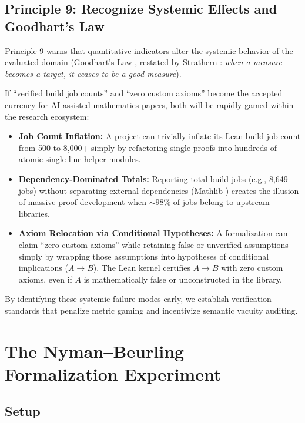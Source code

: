 \documentclass[11pt,a4paper]{article}
\theoremstyle{definition}
\theoremstyle{remark}
\begin{document}
\subsection{Principle 9: Recognize Systemic Effects and Goodhart's Law}

Principle 9 warns that quantitative indicators alter the systemic behavior of the evaluated domain (Goodhart's Law \cite{Goodhart1975}, restated by Strathern \cite{Strathern1997}: \emph{when a measure becomes a target, it ceases to be a good measure}).

If ``verified build job counts'' and ``zero custom axioms'' become the accepted currency for AI-assisted mathematics papers, both will be rapidly gamed within the research ecosystem:
\begin{itemize}[leftmargin=2em]
  \item \textbf{Job Count Inflation:} A project can trivially inflate its Lean build job count from 500 to 8,000+ simply by refactoring single proofs into hundreds of atomic single-line helper modules.
  \item \textbf{Dependency-Dominated Totals:} Reporting total build jobs (e.g., 8,649 jobs) without separating external dependencies (Mathlib \cite{MouraUllrich2021}) creates the illusion of massive proof development when $\sim 98\%$ of jobs belong to upstream libraries.
  \item \textbf{Axiom Relocation via Conditional Hypotheses:} A formalization can claim ``zero custom axioms'' while retaining false or unverified assumptions simply by wrapping those assumptions into hypotheses of conditional implications ($A \to B$). The Lean kernel certifies $A \to B$ with zero custom axioms, even if $A$ is mathematically false or unconstructed in the library.
\end{itemize}

By identifying these systemic failure modes early, we establish verification standards that penalize metric gaming and incentivize semantic vacuity auditing.

\section{The Nyman--Beurling Formalization Experiment}
\label{sec:experiment}

\subsection{Setup}
\end{document}
